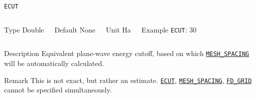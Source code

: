\begin{frame}[allowframebreaks]{\texttt{ECUT}} \label{ECUT}
\vspace*{-12pt}
\begin{columns}
\begin{block}{Type}
Double
\end{block}

\begin{block}{Default}
None
\end{block}

\begin{block}{Unit}
Ha
\end{block}

\begin{block}{Example}
\texttt{ECUT}: 30
\end{block}
\end{columns}

\begin{block}{Description}
Equivalent plane-wave energy cutoff, based on which \hyperlink{MESH_SPACING}{\texttt{MESH\_SPACING}} will be automatically calculated. 
\end{block}

\begin{block}{Remark}
This is not exact, but rather an estimate. \hyperlink{ECUT}{\texttt{ECUT}}, \hyperlink{MESH_SPACING}{\texttt{MESH\_SPACING}}, \hyperlink{FD_GRID}{\texttt{FD\_GRID}} cannot be specified simultaneously.
\end{block}

\end{frame}





